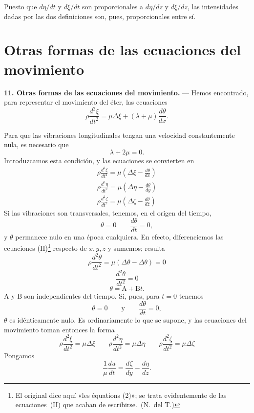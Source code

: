Puesto que $d\eta/dt$ y $d\xi/dt$ son proporcionales a $d\eta/dz$ y
$d\xi/dz$, las intensidades dadas por las dos definiciones son, pues,
proporcionales entre sí.

\section{Otras formas de las ecuaciones del movimiento}

\noindent\textbf{11. Otras formas de las ecuaciones del movimiento.} —
Hemos encontrado, para representar el movimiento
del éter, las ecuaciones
\[
\rho\frac{d^2\xi}{dt^2}=\mu\Delta\xi+(\lambda+\mu)\frac{d\theta}{dx}.
\]

Para que las vibraciones longitudinales tengan una velocidad
constantemente nula, es necesario que
\[
\lambda+2\mu=0.
\]
Introduzcamos esta condición, y las ecuaciones se convierten en
\begin{equation}
\begin{gathered}
\rho\frac{d^2\xi}{dt^2}=\mu\left(\Delta\xi-\frac{d\theta}{dx}\right)\\[3pt]
\rho\frac{d^2\eta}{dt^2}=\mu\left(\Delta\eta-\frac{d\theta}{dy}\right)\\[3pt]
\rho\frac{d^2\zeta}{dt^2}=\mu\left(\Delta\zeta-\frac{d\theta}{dz}\right)
\end{gathered}
\tag{II}
\end{equation}
Si las vibraciones son transversales, tenemos, en el origen del tiempo,
\[
\theta=0\qquad \frac{d\theta}{dt}=0,
\]
y $\theta$ permanece nulo en una época cualquiera. En efecto,
diferenciemos las ecuaciones (II)\footnote{El original dice aquí
«les équations (2)»; se trata evidentemente de las ecuaciones~(II) que
acaban de escribirse.~(N.~del T.)} respecto de $x,y,z$ y sumemos; resulta
\[
\rho\frac{d^2\theta}{dt^2}=\mu(\Delta\theta-\Delta\theta)=0
\]
\[
\frac{d^2\theta}{dt^2}=0
\]
\[
\theta=\mathrm{A}+\mathrm{B}t.
\]
$\mathrm{A}$ y $\mathrm{B}$ son independientes del tiempo. Si, pues, para
$t=0$ tenemos
\[
\theta=0\qquad\text{y}\qquad \frac{d\theta}{dt}=0,
\]
$\theta$ es idénticamente nulo. Es ordinariamente lo que se supone, y las
ecuaciones del movimiento toman entonces la forma
\begin{equation}
\rho\frac{d^2\xi}{dt^2}=\mu\Delta\xi\qquad
\rho\frac{d^2\eta}{dt^2}=\mu\Delta\eta\qquad
\rho\frac{d^2\zeta}{dt^2}=\mu\Delta\zeta
\tag{III}
\end{equation}
Pongamos
\begin{equation}
\frac{1}{\mu}\frac{du}{dt}=\frac{d\zeta}{dy}-\frac{d\eta}{dz}.
\tag{IV}
\end{equation}
